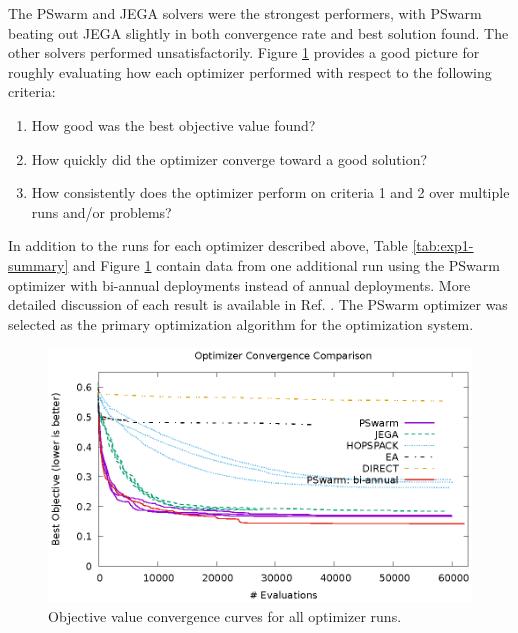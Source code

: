 The PSwarm and JEGA solvers were the strongest performers, with PSwarm beating
out JEGA slightly in both convergence rate and best solution found.  The other
solvers performed unsatisfactorily.  Figure \ref{fig:exp1-converge} provides a
good picture for roughly evaluating how each optimizer performed with respect
to the following criteria:

\begin{enumerate}

    \item How good was the best objective value found?

    \item How quickly did the optimizer converge toward a good solution?

    \item How consistently does the optimizer perform on criteria 1 and 2 over
        multiple runs and/or problems?

\end{enumerate}

In addition to the runs for each optimizer described above, Table
\ref{tab:exp1-summary} and Figure \ref{fig:exp1-converge} contain data from
one additional run using the PSwarm optimizer with bi-annual deployments
instead of annual deployments.  More detailed discussion of each result is
available in Ref. .  The PSwarm optimizer was selected as
the primary optimization algorithm for the \Cyclus optimization system.

\begin{figure}
    \centering
    \includegraphics[width=1.0\textwidth]{converge.eps}
    \captionsetup{justification=centering}
    \caption[Optimizer convergence curves]{Objective value convergence curves for all optimizer runs.}
    \label{fig:exp1-converge}
\end{figure}

